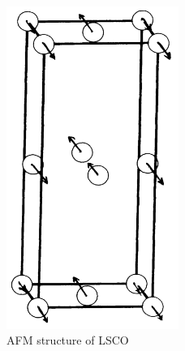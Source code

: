 \begin{figure}
    \centering
    \includegraphics[width=0.5\textwidth]{fig/lsco/lsco_afm.png}
    \caption[AFM structure of LSCO]{AFM structure of LSCO}
    \label{fig:lsco_afm}
\end{figure}